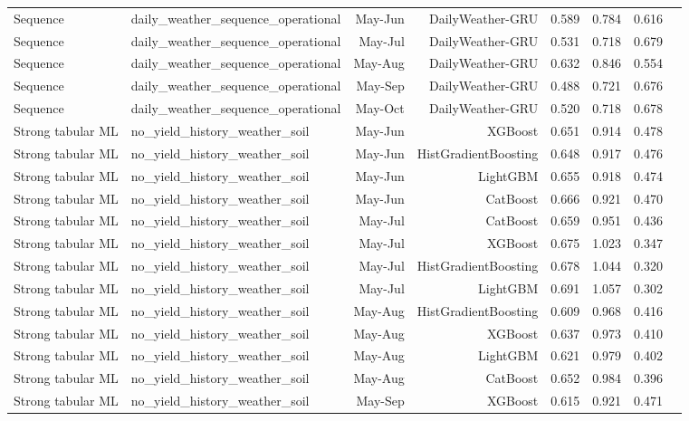 \begin{tabular}{llrrrrrr}
Sequence & daily\_weather\_sequence\_operational & May-Jun & DailyWeather-GRU & 0.589 & 0.784 & 0.616 \\
Sequence & daily\_weather\_sequence\_operational & May-Jul & DailyWeather-GRU & 0.531 & 0.718 & 0.679 \\
Sequence & daily\_weather\_sequence\_operational & May-Aug & DailyWeather-GRU & 0.632 & 0.846 & 0.554 \\
Sequence & daily\_weather\_sequence\_operational & May-Sep & DailyWeather-GRU & 0.488 & 0.721 & 0.676 \\
Sequence & daily\_weather\_sequence\_operational & May-Oct & DailyWeather-GRU & 0.520 & 0.718 & 0.678 \\
Strong tabular ML & no\_yield\_history\_weather\_soil & May-Jun & XGBoost & 0.651 & 0.914 & 0.478 \\
Strong tabular ML & no\_yield\_history\_weather\_soil & May-Jun & HistGradientBoosting & 0.648 & 0.917 & 0.476 \\
Strong tabular ML & no\_yield\_history\_weather\_soil & May-Jun & LightGBM & 0.655 & 0.918 & 0.474 \\
Strong tabular ML & no\_yield\_history\_weather\_soil & May-Jun & CatBoost & 0.666 & 0.921 & 0.470 \\
Strong tabular ML & no\_yield\_history\_weather\_soil & May-Jul & CatBoost & 0.659 & 0.951 & 0.436 \\
Strong tabular ML & no\_yield\_history\_weather\_soil & May-Jul & XGBoost & 0.675 & 1.023 & 0.347 \\
Strong tabular ML & no\_yield\_history\_weather\_soil & May-Jul & HistGradientBoosting & 0.678 & 1.044 & 0.320 \\
Strong tabular ML & no\_yield\_history\_weather\_soil & May-Jul & LightGBM & 0.691 & 1.057 & 0.302 \\
Strong tabular ML & no\_yield\_history\_weather\_soil & May-Aug & HistGradientBoosting & 0.609 & 0.968 & 0.416 \\
Strong tabular ML & no\_yield\_history\_weather\_soil & May-Aug & XGBoost & 0.637 & 0.973 & 0.410 \\
Strong tabular ML & no\_yield\_history\_weather\_soil & May-Aug & LightGBM & 0.621 & 0.979 & 0.402 \\
Strong tabular ML & no\_yield\_history\_weather\_soil & May-Aug & CatBoost & 0.652 & 0.984 & 0.396 \\
Strong tabular ML & no\_yield\_history\_weather\_soil & May-Sep & XGBoost & 0.615 & 0.921 & 0.471 \\

\end{tabular}

